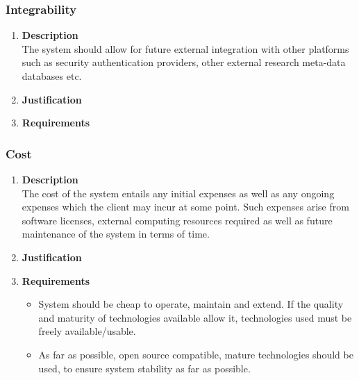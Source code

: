 \documentclass[a4paper,10pt]{article}
\begin{document}
	\subsubsection{Integrability}
		\begin{enumerate}
			\item \textbf{Description} \\
				The system should allow for future external integration with other platforms such as security authentication providers, other external research meta-data databases etc.

			\item \textbf{Justification} \\
			\item \textbf{Requirements}\\
		\end{enumerate}

	\subsubsection{Cost}
		\begin{enumerate}
			\item \textbf{Description} \\
				The cost of the system entails any initial expenses as well as any ongoing expenses which the client may incur at some point. Such expenses arise from software licenses, external computing resources required as well as future maintenance of the system in terms of time.

			\item \textbf{Justification} \\
			\item \textbf{Requirements}\\
				\begin{itemize}
					\item System should be cheap to operate, maintain and extend. If the quality and maturity of technologies available allow it, technologies used must be freely available/usable.
					\item As far as possible, open source compatible, mature technologies should be used, to ensure system stability as far as possible.
				\end{itemize}
		\end{enumerate}
\end{document}
